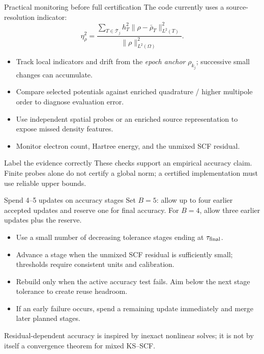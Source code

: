 \documentclass[aspectratio=169,10pt]{beamer}
\begin{document}
\begin{frame}{Practical monitoring before full certification}
\small The code currently uses a source-resolution indicator:
\[
\eta_\rho^2=
\frac{\sum_{T\in\mathcal T_j}h_T^2\|\rho-\bar\rho_T\|_{L^2(T)}^2}
{\|\rho\|_{L^2(\Omega)}^2}.
\]
\begin{itemize}
\item Track local indicators and drift from the \emph{epoch anchor} $\rho_{k_j}$; successive small changes can accumulate.
\item Compare selected potentials against enriched quadrature / higher multipole order to diagnose evaluation error.
\item Use independent spatial probes or an enriched source representation to expose missed density features.
\item Monitor electron count, Hartree energy, and the unmixed SCF residual.
\end{itemize}
\begin{block}{Label the evidence correctly}
These checks support an empirical accuracy claim. Finite probes alone do not certify a global norm; a certified implementation must use reliable upper bounds.
\end{block}
\end{frame}

\begin{frame}{Spend 4--5 updates on accuracy stages}
\small Set $B=5$: allow up to four earlier accepted updates and reserve one for final accuracy. For $B=4$, allow three earlier updates plus the reserve.
\medskip
\centering
{}
\medskip
\begin{itemize}
\item Use a small number of decreasing tolerance stages ending at $\tau_{\rm final}$.
\item Advance a stage when the unmixed SCF residual is sufficiently small; thresholds require consistent units and calibration.
\item Rebuild only when the active accuracy test fails. Aim below the next stage tolerance to create reuse headroom.
\item If an early failure occurs, spend a remaining update immediately and merge later planned stages.
\end{itemize}
\footnotesize Residual-dependent accuracy is inspired by inexact nonlinear solves; it is not by itself a convergence theorem for mixed KS--SCF.
\end{frame}
\end{document}
